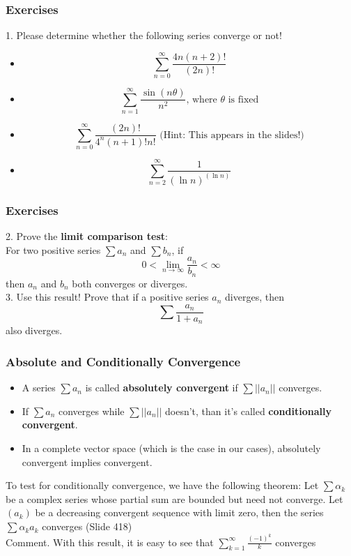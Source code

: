 \documentclass{beamer}
\begin{document}
\begin{frame}
    \frametitle{Exercises}

    1. Please determine whether the following series converge or not!
    \begin{itemize}
        \item $$\sum_{n=0}^\infty \frac{4n(n+2)!}{(2n)!}$$
        \item $$\sum_{n=1}^\infty \frac{\sin(n\theta)}{n^2} \text{, where } \theta \text{ is fixed}$$%
        \item $$\sum_{n=0}^\infty \frac{(2n)!}{4^n (n+1)!n!} \text{ (Hint: This appears in the slides!)}$$%
        \item $$\sum_{n=2}^\infty \frac{1}{(\ln n)^{(\ln n)}}$$%
    \end{itemize}

\end{frame}
\begin{frame}
    \frametitle{Exercises}
    2. Prove the \textbf{limit comparison test}:\\
    \vspace{1em}
    For two positive series $\sum a_n$ and $\sum b_n$, if
    $$0< \underset{n \to \infty}{\lim} \frac{a_n}{b_n}< \infty $$
    then $a_n$ and $b_n$ both converges or diverges.
    \pause \\
    \vspace{0.5em}
    3. Use this result! Prove that if a positive series $a_n$ diverges, then 
    $$\sum \frac{a_n}{1+a_n}$$
    also diverges.
\end{frame}
\begin{frame}
    \frametitle{Absolute and Conditionally Convergence}
    \hspace{1em}
    \begin{itemize}
        \item A series $\sum a_n$ is called \textbf{absolutely convergent} if $\sum ||a_n||$ converges.
        \item If $\sum a_n$ converges while $\sum ||a_n||$ doesn’t, than it’s called \textbf{conditionally convergent}.
        \item In a complete vector space (which is the case in our cases), absolutely
        convergent implies convergent.
    \end{itemize}
To test for conditionally convergence, we have the following theorem:
\hspace{1em}Let $\sum \alpha_k$ be a complex series whose partial sum are bounded but need not converge. 
Let $(a_k)$ be a decreasing convergent sequence with limit zero, then the series $\sum \alpha_k a_k$ converges (Slide 418) 
\\ \vspace{1em}
Comment. With this result, it is easy to see that $\sum_{k=1}^\infty \frac{(-1)^k}{k}$ converges 

\end{frame}
\end{document}
